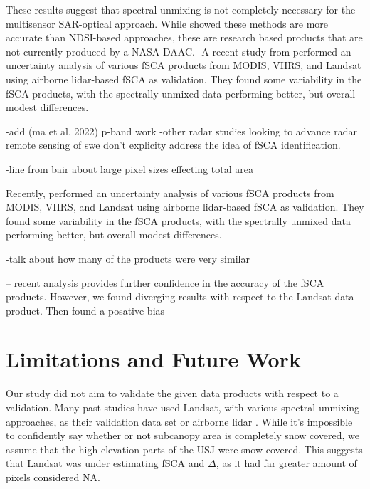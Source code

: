 These results suggest that spectral unmixing is not completely necessary for the multisensor SAR-optical approach. While \cite{stillingerLandsatMODISVIIRS2023a} showed these methods are more accurate than NDSI-based approaches, these are research based products that are not currently produced by a NASA DAAC. %
-A recent study from \cite{stillingerLandsatMODISVIIRS2023a} performed an uncertainty analysis of various fSCA products from MODIS, VIIRS, and Landsat using airborne lidar-based fSCA as validation. They found some variability in the fSCA products, with the spectrally unmixed data performing better, but overall modest differences. \cite{bairHowTradeoffsSatellite2023}


-add (ma et al. 2022) p-band work
-other radar studies looking to advance radar remote sensing of swe don't explicity address the idea of fSCA identification.

-line from bair about large pixel sizes effecting total area

Recently, \cite{stillingerLandsatMODISVIIRS2023a} performed an uncertainty analysis of various fSCA products from MODIS, VIIRS, and Landsat using airborne lidar-based fSCA as validation. They found some variability in the fSCA products, with the spectrally unmixed data performing better, but overall modest differences. \cite{bairHowTradeoffsSatellite2023}


-talk about how many of the products were very similar

-- \cite{stillingerLandsatMODISVIIRS2023} recent analysis provides further confidence in the accuracy of the fSCA products. However, we found diverging results with respect to the Landsat data product. Then found a posative bias 



\hypertarget{ch5-discussion-2}{\section{Limitations and Future Work}\label{ch4-discussion-2}}

Our study did not aim to validate the given data products with respect to a validation. Many past studies have used Landsat, with various spectral unmixing approaches, as their validation data set \citep{painterRetrievalSubpixelSnow2009,rittgerAssessmentMethodsMapping2013 } or airborne lidar \citep{stillingerLandsatMODISVIIRS2023a}. While it's impossible to confidently say whether or not subcanopy area is completely snow covered, we assume that the high elevation parts of the USJ were snow covered. This suggests that Landsat was under estimating fSCA and $\Delta$, as it had far greater amount of pixels considered NA.

